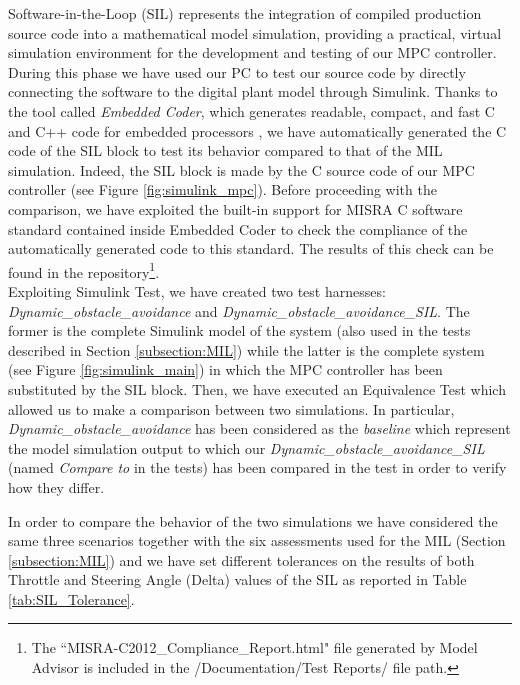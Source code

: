 Software-in-the-Loop (SIL) represents the integration of compiled production source code into a mathematical model simulation, providing a practical, virtual simulation environment for the development and testing of our MPC controller. During this phase we have used our PC to test our source code by directly connecting the software to the digital plant model through Simulink.
Thanks to the tool called \textit{Embedded Coder}, which generates readable, compact, and fast C and C++ code for embedded processors \cite{EmbeddedCoder}, we have automatically generated the C code of the SIL block to test its behavior compared to that of the MIL simulation. Indeed, the SIL block is made by the C source code of our MPC controller (see Figure \ref{fig:simulink_mpc}). Before proceeding with the comparison, we have exploited the built-in support for MISRA C software standard contained inside Embedded Coder to check the compliance of the automatically generated code to this standard. The results of this check can be found in the repository\footnote{The ``MISRA-C2012\_Compliance\_Report.html" file generated by Model Advisor is included in the /Documentation/Test Reports/ file path.}.\\

Exploiting Simulink Test, we have created two test harnesses: \textit{Dynamic\_obstacle\_avoidance} and \textit{Dynamic\_obstacle\_avoidance\_SIL}. The former is the complete Simulink model of the system (also used in the tests described in Section \ref{subsection:MIL}) while the latter is the complete system (see Figure \ref{fig:simulink_main}) in which the MPC controller has been substituted by the SIL block. Then, we have executed an Equivalence Test which allowed us to make a comparison between two simulations. In particular, \textit{Dynamic\_obstacle\_avoidance} has been considered as the \textit{baseline} which represent the model simulation output to which our \textit{Dynamic\_obstacle\_avoidance\_SIL} (named \textit{Compare to} in the tests) has been compared in the test in order to verify how they differ. 

In order to compare the behavior of the two simulations we have considered the same three scenarios  together with the six assessments used for the MIL (Section \ref{subsection:MIL}) and we have set different tolerances on the results of both Throttle and Steering Angle (Delta) values of the SIL as reported in Table \ref{tab:SIL_Tolerance}.

